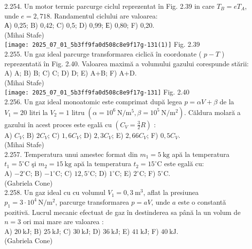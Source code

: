 2.254. Un motor termic parcurge ciclul reprezentat în Fig. 2.39 in care $T_{B}=e T_{A}$, unde $e=2,718$. Randamentul ciclului are valoarea:\\ А) 0,25; B) 0,42; C) 0,5; D) 0,99; Е) 0,80; F) 0,20.\\ (Mihai Stafe)\\ \texttt{[image: 2025\_07\_01\_5b3ff9fa0d508c8e9f17g-131(1)]} Fig. 2.39\\

2.255. Un gaz ideal parcurge transformarea ciclică în coordonate ( $p-T$ ) reprezentată în Fig. 2.40. Valoarea maximă a volumului gazului corespunde stării:\\ A) A; B) B; C) C; D) D; E) A+B; F) A+D.\\ (Mihai Stafe)\\ \texttt{[image: 2025\_07\_01\_5b3ff9fa0d508c8e9f17g-131]} Fig. 2.40\\

2.256. Un gaz ideal monoatomic este comprimat după legea $p=\alpha V+\beta$ de la $V_{1}=20$ litri la $V_{2}=1$ litru $\left(\alpha=10^{6} \mathrm{~N} / \mathrm{m}^{5}, \beta=10^{5} \mathrm{~N} / \mathrm{m}^{2}\right)$. Căldura molară a gazului în acest proces este egalǎ cu $\left(C_{V}=\frac{3}{2} R\right)$ :\\ A) $C_{V}$; B) $2 C_{V}$; C) $1,6 C_{V}$; D) $2,3 C_{V}$; E) $2,66 C_{V}$; F) $0,5 C_{V}$.\\ (Mihai Stafe)\\

2.257. Temperatura unui amestec format din $m_{1}=5 \mathrm{~kg}$ apă la temperatura $t_{1}=5^{\circ} \mathrm{C}$ şi $m_{2}=15 \mathrm{~kg}$ apă la temperatura $t_{2}=15^{\circ} \mathrm{C}$ este egală cu:\\ A) $-2^{\circ} \mathrm{C}$; B) $-1^{\circ} \mathrm{C}$; C) $12,5^{\circ} \mathrm{C}$; D) $1^{\circ} \mathrm{C}$; E) $2^{\circ} \mathrm{C}$; F) $5^{\circ} \mathrm{C}$.\\ (Gabriela Cone)\\

2.258. Un gaz ideal cu cu volumul $V_{1}=0,3 \mathrm{~m}^{3}$, aflat la presiunea $p_{1}=3 \cdot 10^{4} \mathrm{~N} / \mathrm{m}^{2}$, parcurge transformarea $p=a V$, unde $a$ este o constantă pozitivă. Lucrul mecanic efectuat de gaz în destinderea sa până la un volum de $n=3$ ori mai mare are valoarea :\\ A) $20 \mathrm{~kJ}$; B) $25 \mathrm{~kJ}$; C) $30 \mathrm{~kJ}$; D) $36 \mathrm{~kJ}$; E) $41 \mathrm{~kJ}$; F) $40 \mathrm{~kJ}$.\\ (Gabriela Cone)\\


